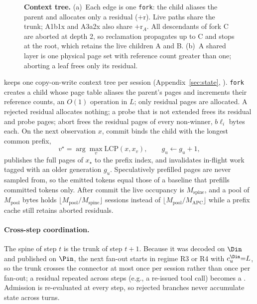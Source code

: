 \begin{figure}[t]
\centering
\resizebox{\textwidth}{!}{}
\caption{\textbf{Context tree.}
(a)~Each edge is one \texttt{fork}: the child aliases the parent and allocates only a residual ($+$r).
Live paths share the trunk; A1b1x and A3a2x also share $+$r$_A$.
All descendants of fork C are aborted at depth 2, so reclamation propagates up to C and stops at the root, which retains the live children A and B.
(b)~A shared layer is one physical page set with reference count greater than one; aborting a leaf frees only its residual.}
\label{fig:tree}
\end{figure}

\sys keeps one copy-on-write context tree per session (Appendix~\ref{sec:state}, ).
\texttt{fork} creates a child whose page table aliases the parent's pages and increments their reference counts, an $O(1)$ operation in $L$; only residual pages are allocated.
A rejected residual allocates nothing; a probe that is not extended frees its residual and probe pages; abort frees the residual pages of every non-winner, $b\ell_i$ bytes each.
On the next observation $x$, commit binds the child with the longest common prefix,
\begin{equation}
\label{eq:lcp}
v^\star=\arg\max_{v}\mathrm{LCP}(x,x_v),\qquad g_u\leftarrow g_u+1,
\end{equation}
publishes the full pages of $x_\star$ to the prefix index, and invalidates in-flight work tagged with an older generation $g_u$.
Speculatively prefilled pages are never sampled from, so the emitted tokens equal those of a baseline that prefills committed tokens only.
After commit the live occupancy is $M_{\mathrm{spine}}$, and a pool of $M_{\mathrm{pool}}$ bytes holds $\lfloor M_{\mathrm{pool}}/M_{\mathrm{spine}}\rfloor$ sessions instead of $\lfloor M_{\mathrm{pool}}/M_{\mathrm{APC}}\rfloor$ while a prefix cache still retains aborted residuals.

\paragraph{Cross-step coordination.}
The spine of step $t$ is the trunk of step $t{+}1$.
Because it was decoded on $\Din$ and published on $\Pin$, the next fan-out starts in regime R3 or R4 with $c_u^{\Din}{=}L$, so the trunk crosses the connector at most once per session rather than once per fan-out; a residual repeated across steps (e.g., a re-issued tool call) becomes a \Hit.
Admission is re-evaluated at every step, so rejected branches never accumulate state across turns.

